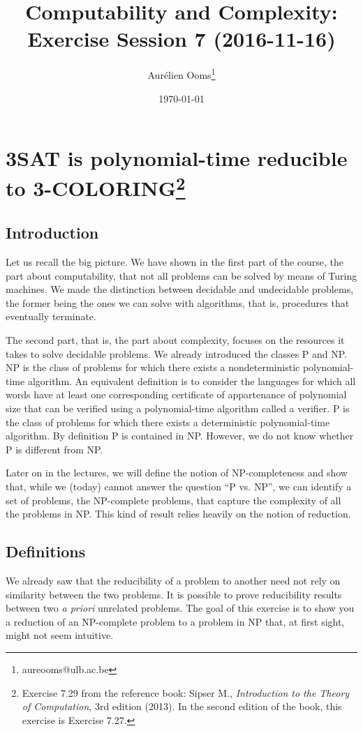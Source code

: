 \documentclass{article}
\title{Computability and Complexity:\\Exercise Session 7 (2016-11-16)}
\author{Aurélien Ooms\footnote{aureooms@ulb.ac.be}}
\date{\today}
\begin{document}
\maketitle
\tableofcontents

\section{3SAT is polynomial-time reducible to 3-COLORING\footnote{%
Exercise 7.29 from the reference book: Sipser M.,
\emph{Introduction to the Theory of Computation}, 3rd edition (2013).
In the second edition of the book, this exercise is Exercise 7.27.}}

\subsection{Introduction}

Let us recall the big picture. We have shown in the first part of the course,
the part about computability, that not all problems can be solved by means of
Turing machines. We made the distinction between decidable and undecidable
problems, the former being the ones we can solve with algorithms, that is,
procedures that eventually terminate.

The second part, that is, the part about complexity, focuses on the resources
it takes to solve decidable problems. We already introduced the classes P and
NP. NP is the class of problems for which there exists a nondeterministic
polynomial-time algorithm. An equivalent definition is to consider the
languages for which all words have at least one corresponding certificate of
appartenance of polynomial size that can be verified using a polynomial-time
algorithm called a verifier. P is the class of problems for which there exists
a deterministic polynomial-time algorithm. By definition P is contained in NP.
However, we do not know whether P is different from NP.

Later on in the lectures, we will define the notion of NP-completeness and show
that, while we (today) cannot answer the question ``P vs. NP'', we can identify
a set of problems, the NP-complete problems, that capture the complexity of all
the problems in NP. This kind of result relies heavily on the notion of
reduction.

\subsection{Definitions}

We already saw that the reducibility of a problem to
another need not rely on similarity between the two problems. It is
possible to prove reducibility results between two \emph{a priori} unrelated problems.
The goal of this exercise is to show you a reduction of an NP-complete
problem to a problem in NP that, at first sight, might not seem intuitive.
\end{document}
